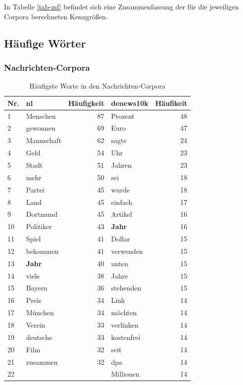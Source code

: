 \documentclass[11pt, a4paper]{article}
\begin{document}
In Tabelle \ref{tab-zsf} befindet sich eine Zusammenfassung der für die
jeweiligen Corpora berechneten Kenngrößen.


\subsection{H\"aufige W\"orter}

\subsubsection{Nachrichten-Corpora}

\begin{table}[ht]
    \begin{tabular}{l*{2}{lr}}
    \toprule
    Nr. & nl & Häufigkeit & denews10k & Häufikeit\\
    \midrule
    1  & Menschen    & 87 &  Prozent     & 48 \\
    2  & gewonnen    & 69 &  Euro        & 47 \\
    3  & Mannschaft  & 62 &  sagte       & 24 \\
    4  & Geld        & 54 &  Uhr         & 23 \\
    5  & Stadt       & 51 &  Jahren      & 23 \\
    6  & mehr        & 50 &  sei         & 18 \\
    7  & Partei      & 45 &  wurde       & 18 \\
    8  & Land        & 45 &  einfach     & 17 \\
    9  & Dortmund    & 45 &  Artikel     & 16 \\
    10 & Politiker   & 43 &  \textbf{Jahr}        & 16 \\
    11 & Spiel       & 41 &  Dollar      & 15 \\
    12 & bekommen    & 41 &  verwenden   & 15 \\
    13 & \textbf{Jahr}        & 40 &  unten       & 15 \\
    14 & viele       & 38 &  Jahre       & 15 \\
    15 & Bayern      & 36 &  stehenden   & 15 \\
    16 & Preis       & 34 &  Link        & 14 \\
    17 & München     & 34 &  möchten     & 14 \\
    18 & Verein      & 33 &  verlinken   & 14 \\
    19 & deutsche    & 33 &  kostenfrei  & 14 \\
    20 & Film        & 32 &  seit        & 14 \\
    21 & zusammen    & 32 &  dpa         & 14 \\
    22 &             &    &  Millionen   & 14 \\
    \bottomrule
    \end{tabular}
    \caption{Häufigste Worte in den Nachrichten-Corpora}
    \label{words-nachrichten}
\end{table}
\end{document}
